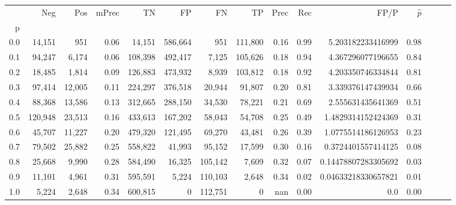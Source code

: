 \begin{tabular}{rrrrrrrrrrrrrrr}
\toprule
{} &      Neg &     Pos & mPrec &       TN &       FP &       FN &       TP &  Prec &   Rec &                 FP/P & $\hat{p}$ \\
p   &          &         &       &          &          &          &          &       &       &                      &           \\
\midrule
0.0 &   14,151 &     951 &  0.06 &   14,151 &  586,664 &      951 &  111,800 &  0.16 &  0.99 &    5.203182233416999 &      0.98 \\
0.1 &   94,247 &   6,174 &  0.06 &  108,398 &  492,417 &    7,125 &  105,626 &  0.18 &  0.94 &    4.367296077196655 &      0.84 \\
0.2 &   18,485 &   1,814 &  0.09 &  126,883 &  473,932 &    8,939 &  103,812 &  0.18 &  0.92 &    4.203350746334844 &      0.81 \\
0.3 &   97,414 &  12,005 &  0.11 &  224,297 &  376,518 &   20,944 &   91,807 &  0.20 &  0.81 &    3.339376147439934 &      0.66 \\
0.4 &   88,368 &  13,586 &  0.13 &  312,665 &  288,150 &   34,530 &   78,221 &  0.21 &  0.69 &    2.555631435641369 &      0.51 \\
0.5 &  120,948 &  23,513 &  0.16 &  433,613 &  167,202 &   58,043 &   54,708 &  0.25 &  0.49 &   1.4829314152424369 &      0.31 \\
0.6 &   45,707 &  11,227 &  0.20 &  479,320 &  121,495 &   69,270 &   43,481 &  0.26 &  0.39 &   1.0775514186126953 &      0.23 \\
0.7 &   79,502 &  25,882 &  0.25 &  558,822 &   41,993 &   95,152 &   17,599 &  0.30 &  0.16 &   0.3724401557414125 &      0.08 \\
0.8 &   25,668 &   9,990 &  0.28 &  584,490 &   16,325 &  105,142 &    7,609 &  0.32 &  0.07 &  0.14478807283305692 &      0.03 \\
0.9 &   11,101 &   4,961 &  0.31 &  595,591 &    5,224 &  110,103 &    2,648 &  0.34 &  0.02 &  0.04633218330657821 &      0.01 \\
1.0 &    5,224 &   2,648 &  0.34 &  600,815 &        0 &  112,751 &        0 &   nan &  0.00 &                  0.0 &      0.00 \\
\bottomrule
\end{tabular}
